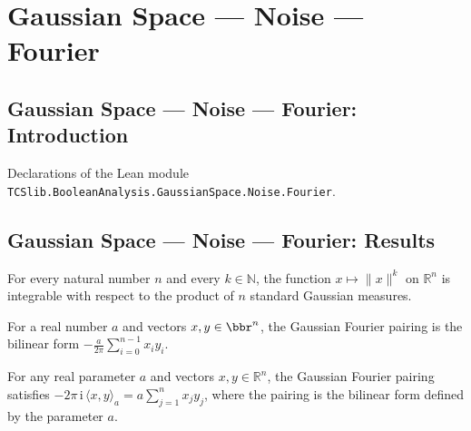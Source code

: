 \section{Gaussian Space --- Noise --- Fourier}
\subsection*{Gaussian Space --- Noise --- Fourier: Introduction}

Declarations of the Lean module \texttt{TCSlib.BooleanAnalysis.GaussianSpace.Noise.Fourier}.

\subsection*{Gaussian Space --- Noise --- Fourier: Results}

\begin{lemma}
\label{BooleanAnalysis.GaussianSpace.integrable_gaussianPi_norm_pow}
\leanok
{}
For every natural number $n$ and every $k\in\mathbb N$, the function $x\mapsto\|x\|^k$
on $\mathbb R^n$ is integrable with respect to the product of $n$ standard Gaussian
measures.
\end{lemma}

\begin{definition}
\label{BooleanAnalysis.GaussianSpace.gaussianFourierPairing}
\leanok
For a real number $a$ and vectors $x,y\in\bbr^n$, the Gaussian Fourier pairing is the
bilinear form $-\frac{a}{2\pi}\sum_{i=0}^{n-1}x_i y_i$.
\end{definition}

\begin{lemma}
\label{BooleanAnalysis.GaussianSpace.gaussianFourierPairing_phase}
\leanok
{}
For any real parameter $a$ and vectors $x,y\in\mathbb R^n$, the Gaussian Fourier pairing
satisfies $-2\pi\,\mathrm{i}\,\langle x,y\rangle_a=a\sum_{j=1}^n x_jy_j$, where the
pairing is the bilinear form defined by the parameter $a$.
\end{lemma}

